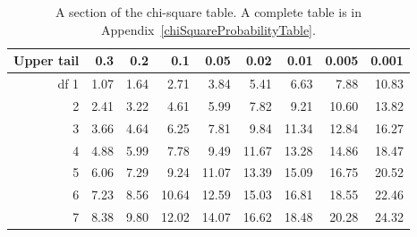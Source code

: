 \begin{table}[h]
	\centering
	\begin{tabular}{r | rrrr | rrrr |}
		\hline
		Upper tail & 0.3 & 0.2 & 0.1 & 0.05 & 0.02 & 0.01 & 0.005 & 0.001 \\ 
		\hline
		df \hfill 1 & \footnotesize 1.07 & \footnotesize 1.64 & \footnotesize 2.71 & \footnotesize 3.84 & \footnotesize 5.41 & \footnotesize 6.63 & \footnotesize 7.88 & \footnotesize 10.83 \\ 
		\hfill 2 & \footnotesize 2.41 & \footnotesize 3.22 & \footnotesize 4.61 & \footnotesize 5.99 & \footnotesize 7.82 & \footnotesize 9.21 & \footnotesize 10.60 & \footnotesize 13.82 \\ 
		3 & \footnotesize 3.66 & \footnotesize 4.64 & \footnotesize 6.25 & \footnotesize 7.81 & \footnotesize 9.84 & \footnotesize 11.34 & \footnotesize 12.84 & \footnotesize 16.27 \\ 
		4 & \footnotesize 4.88 & \footnotesize 5.99 & \footnotesize 7.78 & \footnotesize 9.49 & \footnotesize 11.67 & \footnotesize 13.28 & \footnotesize 14.86 & \footnotesize 18.47 \\ 
		5 & \footnotesize 6.06 & \footnotesize 7.29 & \footnotesize 9.24 & \footnotesize 11.07 & \footnotesize 13.39 & \footnotesize 15.09 & \footnotesize 16.75 & \footnotesize 20.52 \\ 
		\hline
		6 & \footnotesize 7.23 & \footnotesize 8.56 & \footnotesize 10.64 & \footnotesize 12.59 & \footnotesize 15.03 & \footnotesize 16.81 & \footnotesize 18.55 & \footnotesize 22.46 \\ 
		7 & \footnotesize 8.38 & \footnotesize 9.80 & \footnotesize 12.02 & \footnotesize 14.07 & \footnotesize 16.62 & \footnotesize 18.48 & \footnotesize 20.28 & \footnotesize 24.32 \\ 
		\hline
	\end{tabular}
	\caption{A section of the chi-square table. A complete table is in Appendix~\vref{chiSquareProbabilityTable}.}
	\label{chiSquareProbabilityTableShort}
\end{table}

